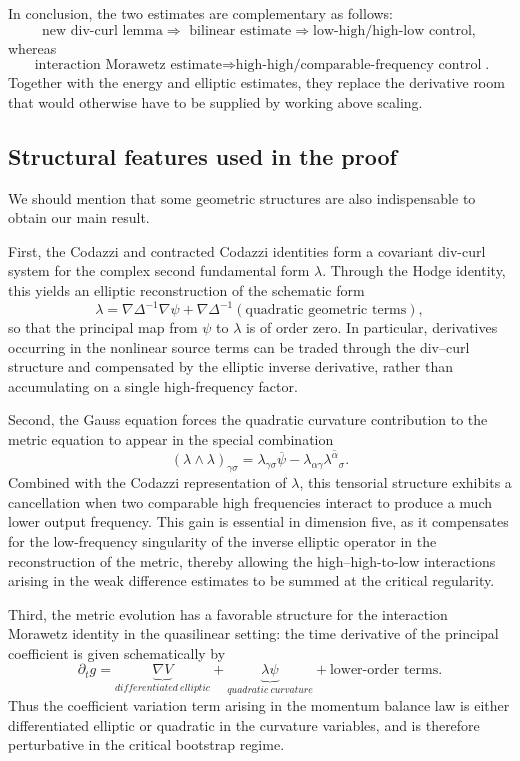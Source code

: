 \documentclass[11pt,letterpaper,reqno]{amsart}
\numberwithin{equation}{section}
\theoremstyle{definition}
\theoremstyle{remark}
\begin{document}
In conclusion, the two estimates are complementary as follows:
{\small
\[
 \boxed{\text{new div-curl lemma}\Longrightarrow \text{ bilinear estimate}\Longrightarrow
 \text{low-high/high-low control}},
\]}
whereas
{\small
\[
 \boxed{\text{interaction Morawetz estimate}
 \Longrightarrow
 \text{high-high/comparable-frequency control}}.
\]}
Together with the energy and elliptic estimates, they replace the derivative room
that would otherwise have to be supplied by working above scaling.

\subsection{Structural features used in the proof}

 We should mention that some geometric structures are also indispensable to obtain our main result. 
 
 First, the Codazzi and contracted Codazzi identities form a covariant div-curl system for the complex second fundamental form \(\lambda\). Through the Hodge identity, this yields an elliptic reconstruction of the schematic form
$$ \lambda=\nabla\Delta^{-1}\nabla\psi +\nabla\Delta^{-1}(\text{quadratic geometric terms}), $$
so that the principal map from \(\psi\) to \(\lambda\) is of order zero. In particular, derivatives occurring in the nonlinear source terms can be traded through the div--curl structure and compensated by the elliptic inverse derivative, rather than accumulating on a single high-frequency factor. 

Second, the Gauss equation forces the quadratic curvature contribution to the metric equation to appear in the special combination
$$ (\lambda\wedge\lambda)_{\gamma\sigma} = \lambda_{\gamma\sigma}\overline{\psi} - \lambda_{\alpha\gamma} \overline{\lambda^\alpha{}_{\sigma}}. $$
Combined with the Codazzi representation of \(\lambda\), this tensorial structure exhibits a cancellation when two comparable high frequencies interact to produce a much lower output frequency. This gain is essential in dimension five, as it compensates for the low-frequency singularity of the inverse elliptic operator in the reconstruction of the metric, thereby allowing the high--high-to-low interactions arising in the weak difference estimates to be summed at the critical regularity.



Third,  the metric evolution has a favorable structure for the interaction Morawetz identity in the quasilinear setting: the time derivative of the principal coefficient is given schematically by
$$ \partial_t g=\underbrace{\nabla V}_{differentiated ~ elliptic}+\underbrace{\lambda\psi}_{quadratic~curvature}+\text{lower-order terms}. $$
Thus the coefficient variation term arising in the momentum balance law is either differentiated elliptic or quadratic in the curvature variables, and is therefore perturbative in the critical bootstrap regime.   
\end{document}
